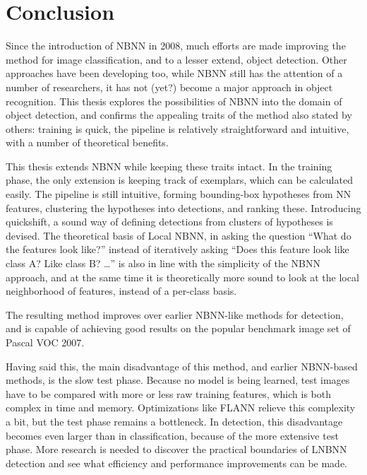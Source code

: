 
\section{Conclusion} %
\label{cha:conclusion}

Since the introduction of NBNN in 2008, much efforts are made improving the method for image classification, and to a lesser extend, object detection. Other approaches have been developing too, while NBNN still has the attention of a number of researchers, it has not (yet?) become a major approach in object recognition. This thesis explores the possibilities of NBNN into the domain of object detection, and confirms the appealing traits of the method also stated by others: training is quick, the pipeline is relatively straightforward and intuitive, with a number of theoretical benefits.

This thesis extends NBNN while keeping these traits intact. In the training phase, the only extension is keeping track of exemplars, which can be calculated easily. The pipeline is still intuitive, forming bounding-box hypotheses from NN features, clustering the hypotheses into detections, and ranking these. Introducing quickshift, a sound way of defining detections from clusters of hypotheses is devised. The theoretical basis of Local NBNN, in asking the question ``What do the features look like?'' instead of iteratively asking ``Does this feature look like class A? Like class B? \ldots'' is also in line with the simplicity of the NBNN approach, and at the same time it is theoretically more sound to look at the local neighborhood of features, instead of a per-class basis.

The resulting method improves over earlier NBNN-like methods for detection, and is capable of achieving good results on the popular benchmark image set of Pascal VOC 2007.

Having said this, the main disadvantage of this method, and earlier NBNN-based methods, is the slow test phase. Because no model is being learned, test images have to be compared with more or less raw training features, which is both complex in time and memory. Optimizations like FLANN relieve this complexity a bit, but the test phase remains a bottleneck. In detection, this disadvantage becomes even larger than in classification, because of the more extensive test phase. More research is needed to discover the practical boundaries of LNBNN detection and see what efficiency and performance improvements can be made.\\


